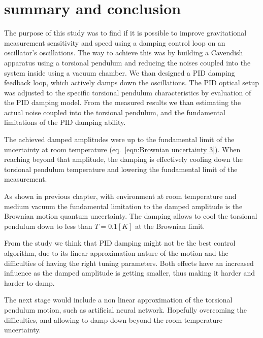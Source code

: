 \documentclass[\main/master.tex]{subfiles}
\begin{document}
\chapter{summary and conclusion}\label{chp:summary and conclusion}
The purpose of this study was to find if it is possible to improve gravitational measurement sensitivity and speed using a damping control loop on an oscillator's oscillations. The way to achieve this was by building a Cavendish apparatus using a torsional pendulum and reducing the noises coupled into the system inside using a vacuum chamber. We than designed a PID damping feedback loop, which actively damps down the oscillations. The PID optical setup was adjusted to the specific torsional pendulum characteristics by evaluation of the PID damping model. From the measured results we than estimating the actual noise coupled into the torsional pendulum, and the fundamental limitations of the PID damping ability.
\par\noindent
The achieved damped amplitudes were up to the fundamental limit of the uncertainty at room temperature (eq.~\ref{eqn:Brownian uncertainty 3}). When reaching beyond that amplitude, the damping is effectively cooling down the torsional pendulum temperature and lowering the fundamental limit of the measurement. 
\par\noindent
As shown in previous chapter, with environment at room temperature and medium vacuum the fundamental limitation to the damped amplitude is the Brownian motion quantum uncertainty. The damping allows to cool the torsional pendulum down to less than $T=0.1[K]$ at the Brownian limit.
\par\noindent
From the study we think that PID damping might not be the best control algorithm, due to its linear approximation nature of the motion and the difficulties of having the right tuning parameters. Both effects have an increased influence as the damped amplitude is getting smaller, thus making it harder and harder to damp.
\par\noindent
The next stage would include a non linear approximation of the torsional pendulum motion, such as artificial neural network. Hopefully overcoming the difficulties, and allowing to damp down beyond the room temperature uncertainty. 
\end{document}
